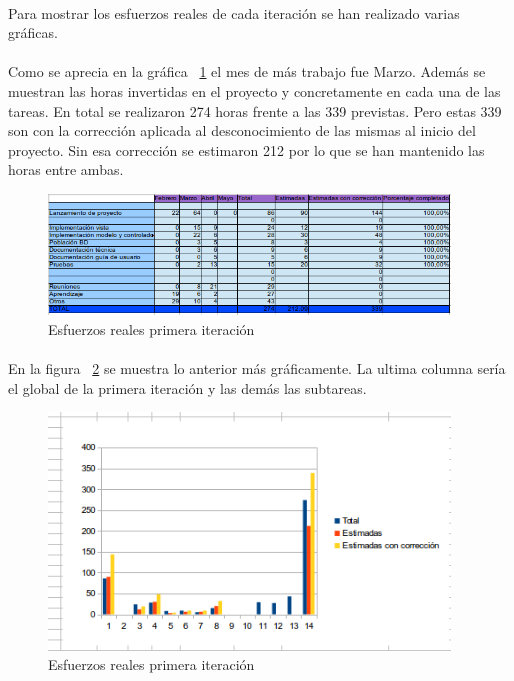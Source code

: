 
\paragraph{} Para mostrar los esfuerzos reales de cada iteración se han realizado varias gráficas.

\paragraph{} Como se aprecia en la gráfica ~\cref{fig:6161} el mes de más trabajo fue Marzo. Además se muestran las horas invertidas en el proyecto y concretamente en cada una de las tareas. En total se realizaron 274 horas frente a las 339 previstas. Pero estas 339 son con la corrección aplicada al desconocimiento de las mismas al inicio del proyecto. Sin esa corrección se estimaron 212 por lo que se han mantenido las horas entre ambas.

\begin{figure}[h!]
\centering
\includegraphics[width=0.95\textwidth]{img/6161}
\caption{Esfuerzos reales primera iteración}
 \label{fig:6161}
\end{figure}

\paragraph{} En la figura ~\cref{fig:6162} se muestra lo anterior más gráficamente. La ultima columna sería el global de la primera iteración y las demás las subtareas.

\begin{figure}[h!]
\centering
\includegraphics[width=0.95\textwidth]{img/6162}
\caption{Esfuerzos reales primera iteración}
 \label{fig:6162}
\end{figure}


